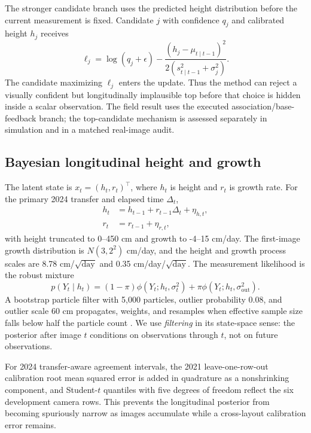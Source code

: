 \documentclass[review,12pt,authoryear]{elsarticle}
\begin{document}
The stronger candidate branch uses the predicted height distribution before the current measurement is fixed. Candidate $j$ with confidence $q_j$ and calibrated height $h_j$ receives
\begin{equation}
\ell_j=\log(q_j+\epsilon)-\frac{(h_j-\mu_{t\mid t-1})^2}{2(s_{t\mid t-1}^2+\sigma_j^2)}.
\label{eq:candidate}
\end{equation}
The candidate maximizing $\ell_j$ enters the update. Thus the method can reject a visually confident but longitudinally implausible top before that choice is hidden inside a scalar observation. The field result uses the executed association/base-feedback branch; the top-candidate mechanism is assessed separately in simulation and in a matched real-image audit.

\subsection{Bayesian longitudinal height and growth}

The latent state is $x_t=(h_t,r_t)^\top$, where $h_t$ is height and $r_t$ is growth rate. For the primary 2024 transfer and elapsed time $\Delta_t$,
\begin{align}
h_t &= h_{t-1}+r_{t-1}\Delta_t+\eta_{h,t},\\
r_t &= r_{t-1}+\eta_{r,t},
\end{align}
with height truncated to 0--450 cm and growth to -4--15 cm/day. The first-image growth distribution is $N(3,2^2)$ cm/day, and the height and growth process scales are 8.78 cm/$\sqrt{\mathrm{day}}$ and 0.35 cm/day/$\sqrt{\mathrm{day}}$. The measurement likelihood is the robust mixture
\begin{equation}
p(Y_t\mid h_t)=(1-\pi)\phi(Y_t;h_t,\sigma_t^2)+\pi\phi(Y_t;h_t,\sigma_{\mathrm{out}}^2).
\label{eq:mixture}
\end{equation}
A bootstrap particle filter with 5,000 particles, outlier probability 0.08, and outlier scale 60 cm propagates, weights, and resamples when effective sample size falls below half the particle count \cite{gordon1993particle}. We use \emph{filtering} in its state-space sense: the posterior after image $t$ conditions on observations through $t$, not on future observations.

For 2024 transfer-aware agreement intervals, the 2021 leave-one-row-out calibration root mean squared error is added in quadrature as a nonshrinking component, and Student-$t$ quantiles with five degrees of freedom reflect the six development camera rows. This prevents the longitudinal posterior from becoming spuriously narrow as images accumulate while a cross-layout calibration error remains.
\end{document}
